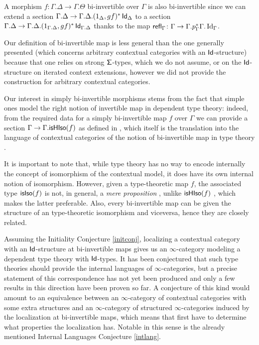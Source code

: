 \begin{rmk}
  A morphism $f\colon\Gamma.\Delta\rightarrow\Gamma.\Theta$ bi-invertible over
  $\Gamma$ is also bi-invertible since we can extend a section
  $\Gamma.\Delta\rightarrow\Gamma.\Delta.(1_\Delta,gf)^*\operatorname{\mathsf{Id}}_\Delta$
  to a section
  $\Gamma.\Delta\rightarrow\Gamma.\Delta.(1_{\Gamma.\Delta},gf)^*\operatorname{\mathsf{Id}}_{\Gamma.\Delta}$
  thanks to the map
  $\operatorname{\mathsf{refl}}_\Gamma\colon\Gamma\rightarrow\Gamma.p^*_\Gamma\Gamma.\operatorname{Id}_\Gamma$.
\end{rmk}

\begin{rmk}
  Our definition of bi-invertible map is less general than the one generally
  presented (which concerns arbitrary contextual categories with an
  $\operatorname{\mathsf{Id}}$-structure) because that one relies on strong $\operatorname{\mathsf{\Sigma}}$-types, which we
  do not assume, or on the $\operatorname{\mathsf{Id}}$-structure on iterated context extensions,
  however we did not provide the construction for arbitrary contextual
  categories.
\end{rmk}

\begin{rmk}
  Our interest in simply bi-invertible morphisms stems from the fact that simple
  ones model the right notion of invertible map in dependent type theory:
  indeed, from the
  required data for a simply bi-invertible map $f$ over $\Gamma$ we can provide
  a section $\Gamma\rightarrow\Gamma.\mathsf{isHIso}({f})$
  as defined in \cite[Def.\ B.3.3]{KL12}, which itself is the translation into
  the language of contextual categories of the notion of bi-invertible map in
  type theory \cite[Def.\ 4.3.1]{Uni13}.

\noindent
  It is important to note that, while type theory has no way to encode
  internally the concept of isomorphism of the contextual model, it does have
  its own internal notion of isomorphism. However, given a type-theoretic map
  $f$, the associated type $\mathsf{isIso}({f})$ is not, in general, a \emph{mere
  proposition} \cite[Def.\ 3.3.1]{Uni13}, unlike $\mathsf{isHIso}({f})$
  \cite[Thm.\ 4.3.2]{Uni13}, which makes the latter
  preferable. Also, every bi-invertible map can be given the structure of an
  type-theoretic isomorphism and viceversa, hence they are closely related.
\end{rmk}

\begin{rmk}
  Assuming the Initiality Conjecture \ref{initconj}, localizing a contextual
  category with an
  $\operatorname{\mathsf{Id}}$-structure at bi-invertible maps gives us an $\infty$-category modeling a
  dependent type theory with $\operatorname{\mathsf{Id}}$-types. It has been conjectured that such
  type theories should provide the internal languages of $\infty$-categories, but a
  precise statement of this correspondence has not yet been produced and only a
  few results in this direction have been proven so far. A conjecture of this kind
  would amount to an equivalence between an $\infty$-category of contextual
  categories with some extra structures and an $\infty$-category of structured
  $\infty$-categories induced by the localization at bi-invertible maps, which
  means that first have to determine what properties the localization has.
  Notable in this sense is the already mentioned Internal Languages Conjecture
  \ref{intlang}.
\end{rmk}

